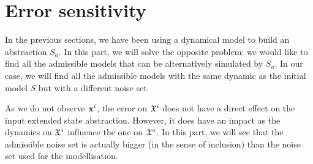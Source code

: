 \newcommand{\xo}{\vect{x}^o}%
\newcommand{\xr}{\vect{x}^r}%
%
\newcommand{\Ao}{A_o}%
\newcommand{\Ar}{A_r}%
\newcommand{\Aro}{A_{ro}}%
%
\newcommand{\Bo}{B_o}%
\newcommand{\Br}{B_r}%
%
\newcommand{\Eo}{E_o}%
\newcommand{\Er}{E_r}%
\newcommand{\Ero}{E_{ro}}%
%
\newcommand{\Xr}{X_r}%
%
\newcommand{\Xrinv}{\mathcal{X}_r}%
\newcommand{\xrinf}{\minf{\x}_r}%
\newcommand{\xrsup}{\msup{\x}_r}%
%
%
\newcommand{\Wsup}{\msup{W}}%
\newcommand{\Winf}{\minf{W}}%
\newcommand{\Wk}{W_k}%
%
\renewcommand{\wr}{\vect{w}^r}%
\newcommand{\wrsup}{\msup{\vect{w}}^r}%
\newcommand{\wrinf}{\minf{\vect{w}}^r}%
\newcommand{\Wrsup}{\msup{W}^r}%
\newcommand{\Wrinf}{\minf{W}^r}%
\newcommand{\Wrk}{W^r_k}%
%
\newcommand{\z}{\vect{z}}%
\newcommand{\zk}{\z_k}%
\newcommand{\zkn}{\z_{k+1}}%
%
\newcommand{\xkn}{\x_{k+1}}%
\newcommand{\xk}{\x_{k}}%
\newcommand{\uk}{\u_{k}}%
\newcommand{\wk}{\w_{k}}%
\newcommand{\yk}{\y_{k}}%
\newcommand{\ykn}{\y_{k+1}}%
%
\newcommand{\Z}{\mathbf{z}}%
\newcommand{\Zk}{\Z_k}%
\newcommand{\Zkn}{\Z_{k+1}}%
\newcommand{\hk}{\vect{h}_{k}}%
\newcommand{\h}{\vect{h}}%
\newcommand{\wnoise}{\msup{\sigma}}%
%
\newcommand{\size}{N}%
\newcommand{\norminf}[1]{\left\|#1\right\|_{\infty}}%
%
\newcommand{\xui}{\minf{\x}^U_r}%
\newcommand{\xus}{\msup{\x}^U_r}%
\newcommand{\An}{\mathcal{A}^r_n}%
\newcommand{\Bn}{\mathcal{B}^r_n}%
\newcommand{\En}{\mathcal{E}^r_n}%
\newcommand{\xuki}{\minf{\x}^{U_k}_r}%
\newcommand{\xuks}{\msup{\x}^{U_k}_r}%
\newcommand{\xuk}{\x^{U_k}_r}%
%
\newcommand{\ANoise}{\Omega}%
\newcommand{\NoiseSet}{\mathcal{W}}%
\newcommand{\infseq}{\omega}%
%
\newcommand{\sykn}{\msup{\y}_{k+1}}%
\newcommand{\iykn}{\minf{\y}_{k+1}}%
%
\newcommand{\filter}{\mathcal{F}}%
%
\section{Error sensitivity}
%
In the previous sections, we have been using a dynamical model to build an abstraction $S_a$. In this part, we will solve the opposite problem:  we would like to find all the admissible models that can be alternatively simulated by $S_a$.
In our case, we will find all the admissible models with the same dynamic as the initial model $S$ but with a different noise set.

As we do not observe $ \mathbf{x}^i$, the error on $\mathfrak{X}^i$ does not have a direct effect on the input extended state abstraction.
However, it does have an impact as the dynamics on $\mathfrak{X}^i$ influence the one on $\mathfrak{X}^o$.
In this part, we will see that the admissible noise set is actually bigger (in the sense of inclusion) than the noise set used for the modellisation.

